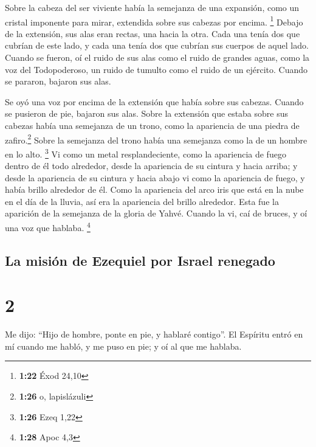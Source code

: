  Sobre la cabeza del ser viviente había la semejanza de
una expansión, como un cristal imponente para mirar, extendida sobre sus
cabezas por encima. \footnote{\textbf{1:22} Éxod 24,10} 
Debajo de la extensión, sus alas eran rectas, una hacia la otra. Cada
una tenía dos que cubrían de este lado, y cada una tenía dos que cubrían
sus cuerpos de aquel lado.  Cuando se fueron, oí el ruido
de sus alas como el ruido de grandes aguas, como la voz del
Todopoderoso, un ruido de tumulto como el ruido de un ejército. Cuando
se pararon, bajaron sus alas.

 Se oyó una voz por encima de la extensión que había
sobre sus cabezas. Cuando se pusieron de pie, bajaron sus alas.
 Sobre la extensión que estaba sobre sus cabezas había
una semejanza de un trono, como la apariencia de una piedra de
zafiro.\footnote{\textbf{1:26} o, lapislázuli} Sobre la semejanza del
trono había una semejanza como la de un hombre en lo alto. \footnote{\textbf{1:26}
  Ezeq 1,22}  Vi como un metal resplandeciente, como la
apariencia de fuego dentro de él todo alrededor, desde la apariencia de
su cintura y hacia arriba; y desde la apariencia de su cintura y hacia
abajo vi como la apariencia de fuego, y había brillo alrededor de él.
 Como la apariencia del arco iris que está en la nube en
el día de la lluvia, así era la apariencia del brillo alrededor. Esta
fue la aparición de la semejanza de la gloria de Yahvé. Cuando la vi,
caí de bruces, y oí una voz que hablaba. \footnote{\textbf{1:28} Apoc
  4,3}

\hypertarget{la-misiuxf3n-de-ezequiel-por-israel-renegado}{%
\subsection{La misión de Ezequiel por Israel
renegado}\label{la-misiuxf3n-de-ezequiel-por-israel-renegado}}

\hypertarget{section-1}{%
\section{2}\label{section-1}}

 Me dijo: ``Hijo de hombre, ponte en pie, y hablaré
contigo''.  El Espíritu entró en mí cuando me habló, y me
puso en pie; y oí al que me hablaba.

